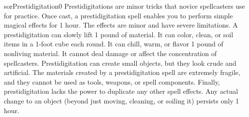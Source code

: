 \begin{spellcard}{sor}{Prestidigitation}{0}
  Prestidigitations are minor tricks that novice spellcasters use for practice.
  Once cast, a prestidigitation spell enables you to perform simple magical effects for 1 hour.
  The effects are minor and have severe limitations.
  A prestidigitation can slowly lift 1 pound of material.
  It can color, clean, or soil items in a 1-foot cube each round.
  It can chill, warm, or flavor 1 pound of nonliving material.
  It cannot deal damage or affect the concentration of spellcasters.
  Prestidigitation can create small objects, but they look crude and artificial.
  The materials created by a prestidigitation spell are extremely fragile,
  and they cannot be used as tools, weapons, or spell components.
  Finally, prestidigitation lacks the power to duplicate any other spell effects.
  Any actual change to an object (beyond just moving, cleaning, or soiling it) persists only 1 hour.

\end{spellcard}
